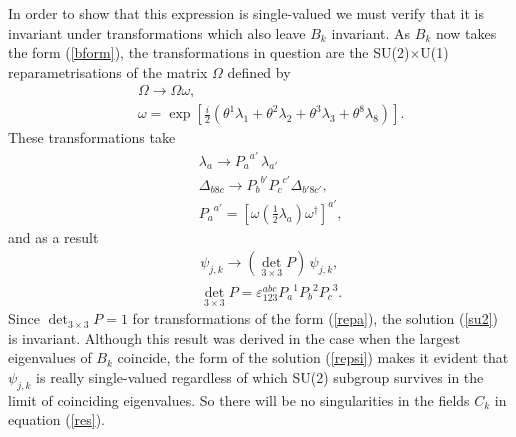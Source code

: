 \documentclass[a4paper,12pt]{article}
\begin{document}
In order to show that this expression is single-valued we must verify that it is invariant under transformations which also leave $B_k$ invariant. As $B_k$ now takes the form (\ref{bform}), the transformations in question are the SU(2)$\times$U(1) reparametrisations of the matrix $\Omega$ defined by
\begin{eqnarray} \label{repa}
&& \Omega \rightarrow \Omega \omega, \\ 
&& \omega = \exp \left[ \frac{i}{2} ( \theta^1 \lambda_1 + \theta^2 \lambda_2 + \theta^3 \lambda_3 + \theta^8 \lambda_8 ) \right]. \nonumber 
\end{eqnarray}
These transformations take
\begin{eqnarray*}
&&\lambda_a \rightarrow {P_a}^{a'} \, \lambda_{a'} \\
&&\Delta_{b8c} \rightarrow {P_b}^{b'} {P_c}^{c'} \Delta_{b'8c'}, \\
&&{P_a}^{a'} = \left[ \omega \left( \frac{1}{2} \lambda_a \right) \omega^{\dagger} \right]^{a'},
\end{eqnarray*}
and as a result
\begin{eqnarray*}
&& \psi_{j,k} \rightarrow \left( \det_{3 \times 3} P \right) \, \psi_{j,k}, \\
&& \det_{3 \times 3} P = \varepsilon_{123}^{abc} {P_a}^{1} {P_b}^{2} {P_c}^{3}.
\end{eqnarray*}
Since $\det_{3 \times 3} P = 1$ for transformations of the form (\ref{repa}), the solution (\ref{su2}) is invariant. Although this result was derived in the case when the largest eigenvalues of $B_k$ coincide, the form of the solution (\ref{repsi}) makes it evident that $\psi_{j,k}$ is really single-valued regardless of which SU(2) subgroup survives in the limit of coinciding eigenvalues. So there will be no singularities in the fields $C_k$ in equation (\ref{res}).
\end{document}
